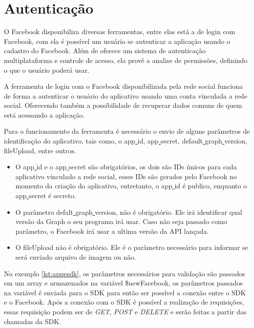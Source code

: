 \section{Autenticação}
O Facebook disponibiliza diversas ferramentas, entre elas está a de login com Facebook, com ela é possível um usuário se autenticar a aplicação usando o cadastro do Facebook. Além de oferece um sistema de autenticação multiplataforma e controle de acesso, ela provê a analise de permissões, definindo o que o usuário poderá usar. \cite{facebook2018c}

A ferramenta de login com o Facebook disponibilizada pela rede social funciona de forma a autenticar o usuário do aplicativo usando uma conta vinculada a rede social. Oferecendo também a possibilidade de recuperar dados comuns de quem está acessando a aplicação.

Para o funcionamento da ferramenta é necessário o envio de alguns parâmetros de identificação do aplicativo, tais como, o app\underline{{ }}id, app\underline{{ }}secret, default\underline{{ }}graph\underline{{ }}version, fileUpload, entre outros.

\begin{itemize}
\item O app\underline{{ }}id e o app\underline{{ }}secret são obrigatórios, os dois são IDs únicos para cada aplicativo vinculado a rede social, esses IDs são gerados pelo Facebook no momento da criação do aplicativo, entretanto, o app\underline{{ }}id é publico, enquanto o app\underline{{ }}secret é secreto.

\item O parâmetro defalt\underline{{ }}graph\underline{{ }}version, não é obrigatório. Ele irá identificar qual versão da Graph o seu programa irá usar. Caso não seja passado como parâmetro, o Facebook irá usar a ultima versão da API lançada.

\item O fileUpload não é obrigatório. Ele é o parâmetro necessário para informar se será enviado arquivo de imagem ou não.
\end{itemize}

No exemplo \ref{lst:appesdk}, os parâmetros necessários para validação são passados em um array e armazenados na variável \$newFacebook, os parâmetros passados na variável é enviada para o SDK para então ser possível a conexão entre o SDK e o Facebook. Após a conexão com o SDK é possível a realização de requisições, essas requisição podem ser de \textit{GET}, \textit{POST} e \textit{DELETE} e serão feitas a partir das chamadas da SDK.

